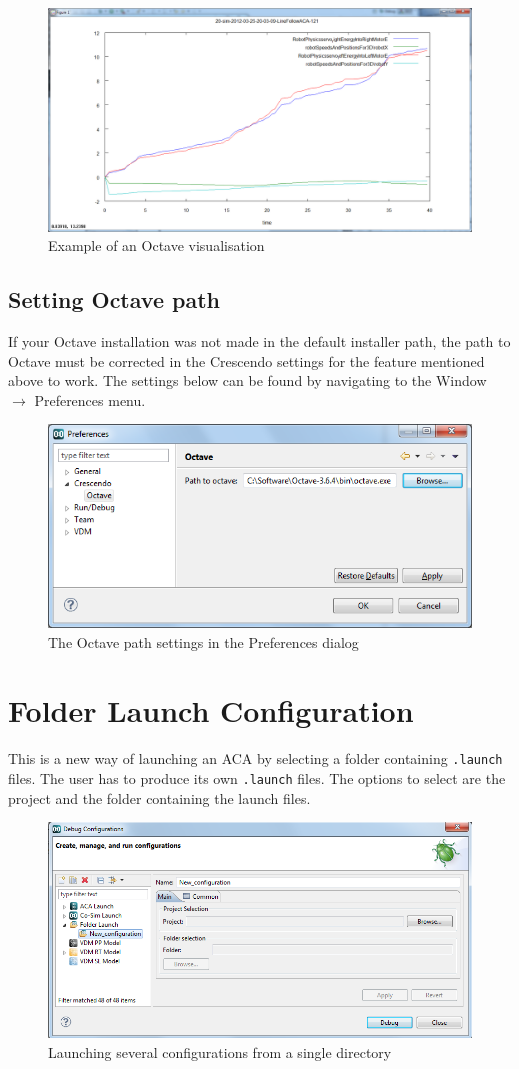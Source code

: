 \documentclass{crescendorepchap}
\begin{document}
\begin{figure}[htbp]
\centering
\includegraphics[width=.6\textwidth]{images/OctavePlotting.png}
\caption{Example of an Octave visualisation}
\end{figure}

\subsection{Setting Octave path}

If your Octave installation was not made in the default installer path,
the path to Octave must be corrected in the Crescendo settings for the
feature mentioned above to work. The settings below can be found by
navigating to the Window $\rightarrow$ Preferences menu.

\begin{figure}[htbp]
\centering
\includegraphics[width=.6\textwidth]{images/OctaveSettings.png}
\caption{The Octave path settings in the Preferences dialog}
\end{figure}

\section{Folder Launch Configuration}

This is a new way of launching
an ACA by selecting a folder containing \texttt{.launch} files. The user has to
produce its own \texttt{.launch} files. The options to select are the project
and the folder containing the launch files.

\begin{figure}[htbp]
\centering
\includegraphics[width=.6\textwidth]{images/DirectoryLaunchMainTab.png}
\caption{Launching several configurations from a single directory}
\end{figure}
\end{document}
